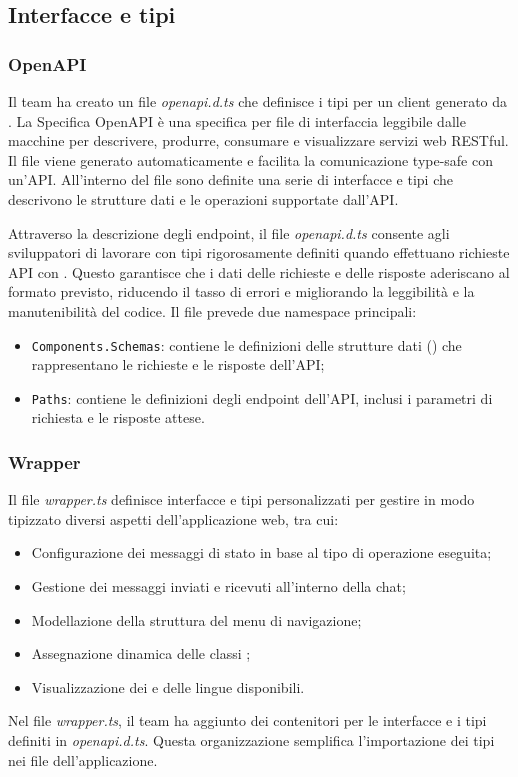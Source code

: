 \subsection{Interfacce e tipi} \label{InterfacceTipi}

\subsubsection{OpenAPI} \label{OpenAPI}

\par Il team ha creato un file \textit{openapi.d.ts} che definisce i tipi  per un client generato da . La Specifica OpenAPI è una specifica per file di interfaccia leggibile dalle macchine per descrivere, produrre, consumare e visualizzare servizi web RESTful. Il file viene generato automaticamente e facilita la comunicazione type-safe con un'API. All'interno del file sono definite una serie di interfacce e tipi che descrivono le strutture dati e le operazioni supportate dall'API.

\par Attraverso la descrizione degli endpoint, il file \textit{openapi.d.ts} consente agli sviluppatori  di lavorare con tipi rigorosamente definiti quando effettuano richieste API con . Questo garantisce che i dati delle richieste e delle risposte aderiscano al formato previsto, riducendo il tasso di errori e migliorando la leggibilità e la manutenibilità del codice. Il file prevede due namespace principali:
\begin{itemize}
  \item \texttt{Components.Schemas}: contiene le definizioni delle strutture dati () che rappresentano le richieste e le risposte dell'API;
  \item \texttt{Paths}: contiene le definizioni degli endpoint dell'API, inclusi i parametri di richiesta e le risposte attese.
\end{itemize}

\subsubsection{Wrapper} \label{OpenAPI}

\par Il file \textit{wrapper.ts} definisce interfacce e tipi personalizzati per gestire in modo tipizzato diversi aspetti dell'applicazione web, tra cui:
\begin{itemize}
  \item Configurazione dei messaggi di stato in base al tipo di operazione eseguita;
  \item Gestione dei messaggi inviati e ricevuti all'interno della chat;
  \item Modellazione della struttura del menu di navigazione;
  \item Assegnazione dinamica delle classi ;
  \item Visualizzazione dei  e delle lingue disponibili.
\end{itemize}

\vspace{0.5\baselineskip}
\par Nel file \textit{wrapper.ts}, il team ha aggiunto dei contenitori per le interfacce e i tipi definiti in \textit{openapi.d.ts}. Questa organizzazione semplifica l'importazione dei tipi nei file dell'applicazione.
